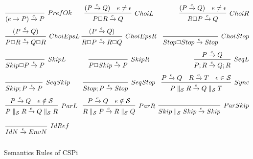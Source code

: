 \documentclass{comjnl}
\begin{document}
\begin{figure*}
\caption{\label{fig:my-label} Semantics Rules of CSPi}
\[
\arraycolsep=1.4pt
\def\arraystretch{2.6}
\begin{array}{l c r}
\infer[PrefOk]{(e \rightarrow P) \xrightarrow{e}P}{} & \infer[ChoiL]{P \Box R \xrightarrow{e} Q}{(P \xrightarrow{e} Q) & e \neq \epsilon} & \infer[ChoiR]{R \Box P \xrightarrow{e} Q}{(P \xrightarrow{e} Q) & e \neq \epsilon} \\
\infer[ChoiEpsL]{P \Box R \xrightarrow{\epsilon} Q \Box R}{(P \xrightarrow{\epsilon} Q)} & \infer[ChoiEpsR]{R \Box P \xrightarrow{\epsilon} R \Box Q}{(P \xrightarrow{\epsilon} Q)} & \infer[ChoiStop]{Stop \Box Stop \xrightarrow{\epsilon} Stop}{} \\
\infer[SkipL]{Skip \Box P \xrightarrow{\epsilon} P}{} & \infer[SkipR]{P \Box Skip \xrightarrow{\epsilon} P}{} & \infer[SeqL]{P ; R \xrightarrow{e} Q ; R}{P \xrightarrow{e} Q} \\
\infer[SeqSkip]{Skip ; P \xrightarrow{\epsilon} P}{} & \infer[SeqStop]{Stop ; P \xrightarrow{\epsilon} Stop}{} & \infer[Sync]{P \parallel_\mathcal{S} R \xrightarrow{e} Q \parallel_\mathcal{S} T}{P \xrightarrow{e} Q & R \xrightarrow{e} T & e \in \mathcal{S}} \\
\infer[ParL]{P \parallel_\mathcal{S} R \xrightarrow{e} Q \parallel_\mathcal{S} R}{P \xrightarrow{e} Q & e \notin \mathcal{S}} & \infer[ParR]{R \parallel_\mathcal{S} P \xrightarrow{e} R \parallel_\mathcal{S} Q}{P  \xrightarrow{e} Q & e \notin \mathcal{S}} & \infer[ParSkip]{Skip \parallel_\mathcal{S} Skip \xrightarrow{\epsilon} Skip}{} \\
\infer[IdRef]{Id N \xrightarrow{\epsilon} Env N}{}
\end{array}
\]
\end{figure*}
\end{document}
